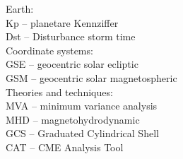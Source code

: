 Earth:\\
Kp -- planetare Kennziffer\\
Dst -- Disturbance storm time\\

Coordinate systems:\\
GSE -- geocentric solar ecliptic\\
GSM -- geocentric solar magnetospheric\\

Theories and techniques:\\
MVA -- minimum variance analysis\\
MHD -- magnetohydrodynamic\\
GCS -- Graduated Cylindrical Shell\\
CAT -- CME Analysis Tool\\
